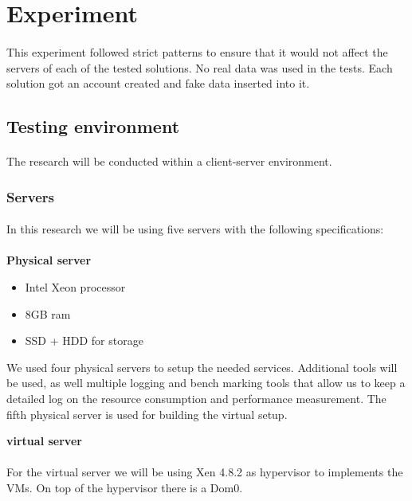 \section{Experiment}
\paragraph{}
This experiment followed strict patterns to ensure that it would not affect the servers of each of the tested solutions. No real data was used in the tests. Each solution got an account created and fake data inserted into it.


\subsection{Testing environment}
\paragraph{}
The research will be conducted within a client-server environment.

\subsubsection{Servers}
\paragraph{}
In this research we will be using five servers with the following specifications:\\~\\
\textbf{Physical server}
\begin{itemize}
	\item Intel Xeon processor
	\item 8GB ram
	\item SSD + HDD for storage
\end{itemize}

 We used four physical servers to setup the needed services. Additional tools will be used, as well multiple logging and bench marking tools that allow us to keep a detailed log on the resource consumption and performance measurement. The fifth physical server is used for building the virtual setup.
 
\textbf{virtual server}
\paragraph{}
For the virtual server we will be using Xen 4.8.2 as hypervisor to implements the VMs. On top of the hypervisor there is a Dom0.

